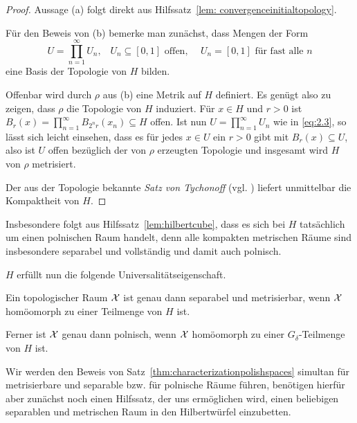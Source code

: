 \documentclass[../main/main.tex]{subfiles}
\begin{document}
	\begin{proof}
		Aussage (a) folgt direkt aus Hilfssatz~\ref{lem: convergenceinitialtopology}.
		
		Für den Beweis von (b) bemerke man zunächst, dass Mengen der Form 
		\[U = \prod_{n=1}^{\infty} U_n\text{,} \quad U_n \subseteq [0, 1] \text{ offen, }
		\quad U_n = [0, 1] \text{ für fast alle } n \label{eq:2.3} \tag{2.3}\]
		eine Basis der Topologie von $H$ bilden.
		
		Offenbar wird durch $\rho$ aus (b) eine Metrik auf $H$ definiert. 
		Es genügt also zu zeigen, dass $\rho$ die Topologie von $H$ induziert. 
		Für $x \in H$ und $r > 0$ ist 
		$B_r(x) = \prod_{n=1}^{\infty} B_{2^n r}(x_n) \subseteq H$ 
		offen. Ist nun $U = \prod_{n=1}^{\infty} U_n$ wie in \eqref{eq:2.3}, 
		so lässt sich leicht einsehen, dass es für jedes $x \in U$ ein $r > 0$ 
		gibt mit $B_r(x) \subseteq U$, also ist $U$ offen bezüglich der von $\rho$ 
		erzeugten Topologie und insgesamt wird $H$ von $\rho$ metrisiert.
		
		Der aus der Topologie bekannte \emph{Satz von Tychonoff} (vgl. \cite[Satz 2.7.1]{Simon.2015}) liefert 
		unmittelbar die Kompaktheit von $H$.
	\end{proof}
	
	\begin{Bemerkung}
		Insbesondere folgt aus Hilfssatz~\ref{lem:hilbertcube}, dass es sich bei $H$ tatsächlich um einen polnischen Raum handelt, 
		denn alle kompakten metrischen Räume sind insbesondere 
		separabel und vollständig und damit auch polnisch.
	\end{Bemerkung}
	
	$H$ erfüllt nun die folgende Universalitätseigenschaft.
	
	\begin{Satz}
		\label{thm:characterizationpolishspaces}
		Ein topologischer Raum $\mathcal{X}$ ist genau dann separabel und metrisierbar, wenn $\mathcal{X}$ homöomorph zu einer Teilmenge von $H$ ist.
		
		Ferner ist $\mathcal{X}$ genau dann polnisch, wenn $\mathcal{X}$ homöomorph zu einer $G_\delta$-Teilmenge von $H$ ist.
	\end{Satz}
	
	Wir werden den Beweis von Satz~\ref{thm:characterizationpolishspaces} simultan für metrisierbare und 
	separable bzw. für polnische Räume führen, benötigen hierfür aber zunächst noch einen Hilfssatz, der uns ermöglichen wird, 
	einen beliebigen separablen und metrischen Raum in den Hilbertwürfel einzubetten.
	
\end{document}
